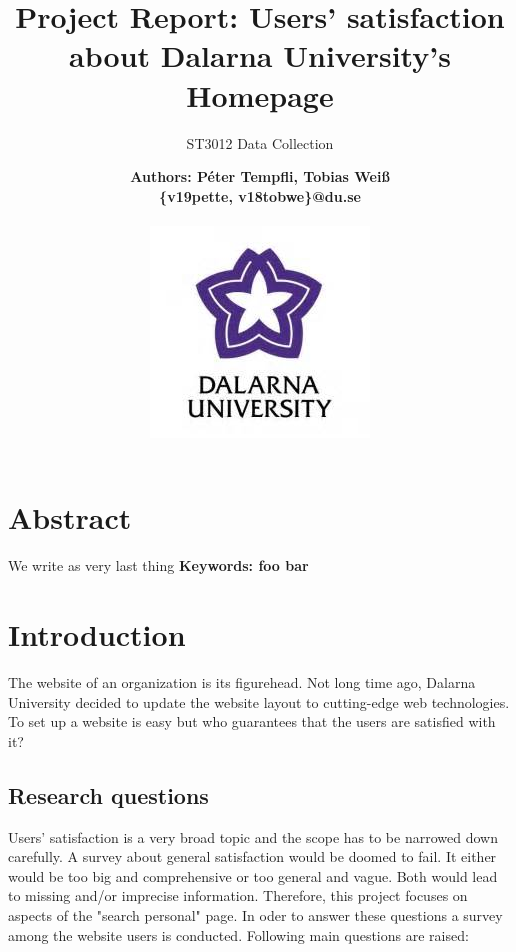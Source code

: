 \documentclass[12pt,a4paper,paper=a4,oneside,titlepage,pdftex]{scrartcl}
\begin{document}
	

\title{Project Report: Users' satisfaction about Dalarna University's Homepage}
\subtitle{ST3012 Data Collection}
\author{
	\bfseries\Large Authors: Péter Tempfli, Tobias Weiß\\
	\{v19pette, v18tobwe\}@du.se
	\\ \\
	\includegraphics[]{figures/du-logo.jpg}\\
}

\maketitle
\tableofcontents
\newpage

\section{Abstract}
We write as very last thing
\vspace{10px}
\textbf{Keywords: foo bar}

\section{Introduction}
The website of an organization is its figurehead. Not long time ago, Dalarna University decided to update the website layout to cutting-edge web technologies. To set up a website is easy but who guarantees that the users are satisfied with it?

\subsection{Research questions}
Users' satisfaction is a very broad topic and the scope has to be narrowed down carefully. A survey about general satisfaction would be doomed to fail. It either would be too big and comprehensive or too general and vague. Both would lead to missing and/or imprecise information. Therefore, this project focuses on aspects of the "search personal" page. In oder to answer these questions a survey among the website users is conducted. Following main questions are raised:
\end{document}
